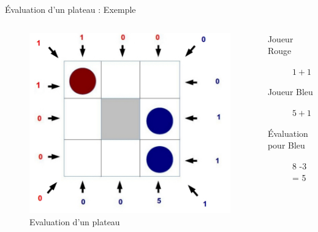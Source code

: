 \documentclass[compress, 12pt]{beamer}
\begin{document}
\begin{frame}{Évaluation d'un plateau : Exemple}
    \begin{columns}
        \begin{column}[l]{0.5\textwidth}
            \begin{figure}
                \includegraphics[width=1.1\textwidth]{./pix/evaluation}
                \centering
                \caption{Evaluation d'un plateau}
            \end{figure}
        \end{column}
        
        \begin{column}[r]{0.5\textwidth}
            \begin{description}
                \item[Joueur Rouge] $1 + 1 + 1 = 3$
                \item[Joueur Bleu] $5 + 1 + 1 + 1 = 8$
                \item[Évaluation pour Bleu] 8 -3 = 5
            \end{description}
        \end{column}

  \end{columns}
\end{frame}
\end{document}
